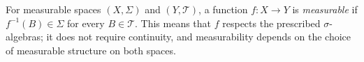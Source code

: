 
For measurable spaces $(X,\Sigma)$ and $(Y,\mathcal T)$, a function $f:X\to Y$ is \emph{measurable} if $f^{-1}(B)\in\Sigma$ for every $B\in\mathcal T$. This means that $f$ respects the prescribed $\sigma$-algebras; it does not require continuity, and measurability depends on the choice of measurable structure on both spaces.
